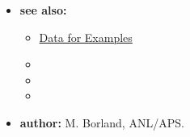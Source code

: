 \begin{itemize}
\begin{itemize}
    \end{itemize} 
\item {\bf see also:} 
        \begin{itemize} 
        \item \hyperref[exampleData]{Data for Examples}
        \item {} 
        \item {} 
        \item {} 
        \end{itemize} 
\item {\bf author:} M. Borland, ANL/APS. 
\end{itemize} 
 
